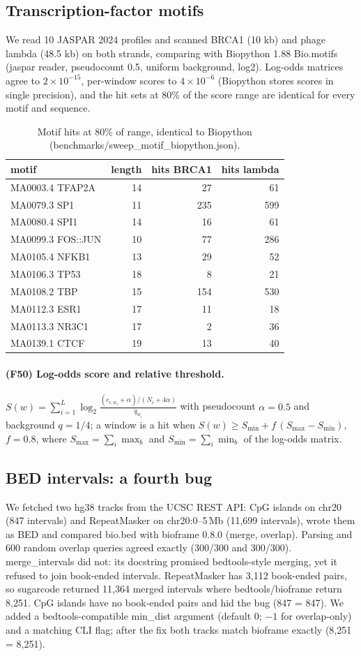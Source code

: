 \subsection{Transcription-factor motifs}
We read 10 JASPAR 2024 profiles and scanned BRCA1 (10 kb) and phage lambda (48.5 kb) on both strands, comparing with Biopython 1.88 Bio.motifs (jaspar reader, pseudocount 0.5, uniform background, log2). Log-odds matrices agree to $2\times10^{-15}$, per-window scores to $4\times10^{-6}$ (Biopython stores scores in single precision), and the hit sets at 80\% of the score range are identical for every motif and sequence.
\begin{table}[h]\centering\small\begin{tabular}{lrrr}\hline motif & length & hits BRCA1 & hits lambda\\\hline
MA0003.4 TFAP2A & 14 & 27 & 61\\
MA0079.3 SP1 & 11 & 235 & 599\\
MA0080.4 SPI1 & 14 & 16 & 61\\
MA0099.3 FOS::JUN & 10 & 77 & 286\\
MA0105.4 NFKB1 & 13 & 29 & 52\\
MA0106.3 TP53 & 18 & 8 & 21\\
MA0108.2 TBP & 15 & 154 & 530\\
MA0112.3 ESR1 & 17 & 11 & 18\\
MA0113.3 NR3C1 & 17 & 2 & 36\\
MA0139.1 CTCF & 19 & 13 & 40\\
\hline\end{tabular}\caption{Motif hits at 80\% of range, identical to Biopython (benchmarks/sweep\_motif\_biopython.json).}\end{table}
\paragraph{(F50) Log-odds score and relative threshold.} $S(w)=\sum_{i=1}^{L}\log_2\frac{(c_{i,w_i}+\alpha)/(N_i+4\alpha)}{q_{w_i}}$ with pseudocount $\alpha=0.5$ and background $q=1/4$; a window is a hit when $S(w)\ge S_{\min}+f\,(S_{\max}-S_{\min})$, $f=0.8$, where $S_{\max}=\sum_i\max_b$ and $S_{\min}=\sum_i\min_b$ of the log-odds matrix.
\subsection{BED intervals: a fourth bug}
We fetched two hg38 tracks from the UCSC REST API: CpG islands on chr20 (847 intervals) and RepeatMasker on chr20:0--5\,Mb (11,699 intervals), wrote them as BED and compared bio.bed with bioframe 0.8.0 (merge, overlap). Parsing and 600 random overlap queries agreed exactly (300/300 and 300/300). merge\_intervals did not: its docstring promised bedtools-style merging, yet it refused to join book-ended intervals. RepeatMasker has 3,112 book-ended pairs, so sugarcode returned 11,364 merged intervals where bedtools/bioframe return 8,251. CpG islands have no book-ended pairs and hid the bug (847 = 847). We added a bedtools-compatible min\_dist argument (default 0; $-1$ for overlap-only) and a matching CLI flag; after the fix both tracks match bioframe exactly (8,251 = 8,251).
